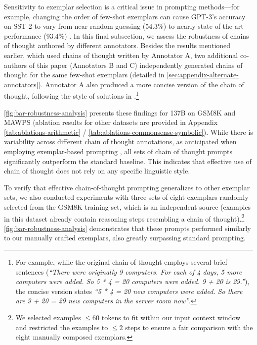Sensitivity to exemplar selection is a critical issue in prompting methods—for example, changing the order of few-shot exemplars can cause GPT-3’s accuracy on SST-2 to vary from near random guessing (54.3\%) to nearly state-of-the-art performance (93.4\%) \citep{zhao2021calibrate}. In this final subsection, we assess the robustness of chains of thought authored by different annotators. Besides the results mentioned earlier, which used chains of thought written by Annotator A, two additional co-authors of this paper (Annotators B and C) independently generated chains of thought for the same few-shot exemplars (detailed in \cref{sec:appendix-alternate-annotators}). Annotator A also produced a more concise version of the chain of thought, following the style of solutions in \citet{cobbe2021training}.\footnote{For example, while the original chain of thought employs several brief sentences (\textit{``There were originally 9 computers. For each of 4 days, 5 more computers were added. So 5 * 4 = 20 computers were added. 9 + 20 is 29.''}), the concise version states \textit{``5 * 4 = 20 new computers were added. So there are 9 + 20 = 29 new computers in the server room now''}.}

\cref{fig:bar-robustness-analysis} presents these findings for \lamda{} 137B on GSM8K and MAWPS (ablation results for other datasets are provided in Appendix \cref{tab:ablations-arithmetic} / \cref{tab:ablations-commonsense-symbolic}). While there is variability across different chain of thought annotations, as anticipated when employing exemplar-based prompting \citep{le-scao-rush-2021-many,reynolds2021prompt,zhao2021calibrate}, all sets of chain of thought prompts significantly outperform the standard baseline. This indicates that effective use of chain of thought does not rely on any specific linguistic style.

To verify that effective chain-of-thought prompting generalizes to other exemplar sets, we also conducted experiments with three sets of eight exemplars randomly selected from the GSM8K training set, which is an independent source (examples in this dataset already contain reasoning steps resembling a chain of thought).\footnote{We selected examples $\leq 60$ tokens to fit within our input context window and restricted the examples to $\leq 2$ steps to ensure a fair comparison with the eight manually composed exemplars.} \cref{fig:bar-robustness-analysis} demonstrates that these prompts performed similarly to our manually crafted exemplars, also greatly surpassing standard prompting.

